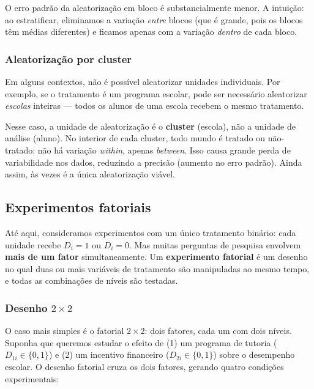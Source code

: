 \documentclass[
]{article}
\begin{document}
O erro padrão da aleatorização em bloco é substancialmente menor. A intuição: ao estratificar, eliminamos a variação \emph{entre} blocos (que é grande, pois os blocos têm médias diferentes) e ficamos apenas com a variação \emph{dentro} de cada bloco.

\subsubsection{Aleatorização por cluster}\label{aleatorizauxe7uxe3o-por-cluster}

Em alguns contextos, não é possível aleatorizar unidades individuais. Por exemplo, se o tratamento é um programa escolar, pode ser necessário aleatorizar \emph{escolas} inteiras --- todos os alunos de uma escola recebem o mesmo tratamento.

Nesse caso, a unidade de aleatorização é o \textbf{cluster} (escola), não a unidade de análise (aluno). No interior de cada cluster, todo mundo é tratado ou não-tratado: não há variação \emph{within}, apenas \emph{between}. Isso causa grande perda de variabilidade nos dados, reduzindo a precisão (aumento no erro padrão). Ainda assim, às vezes é a única aleatorização viável.

\subsection{Experimentos fatoriais}\label{experimentos-fatoriais}

Até aqui, consideramos experimentos com um único tratamento binário: cada unidade recebe \(D_i = 1\) ou \(D_i = 0\). Mas muitas perguntas de pesquisa envolvem \textbf{mais de um fator} simultaneamente. Um \textbf{experimento fatorial} é um desenho no qual duas ou mais variáveis de tratamento são manipuladas ao mesmo tempo, e todas as combinações de níveis são testadas.

\subsubsection{\texorpdfstring{Desenho \(2 \times 2\)}{Desenho 2 \textbackslash times 2}}\label{desenho-2-times-2}

O caso mais simples é o fatorial \(2 \times 2\): dois fatores, cada um com dois níveis. Suponha que queremos estudar o efeito de (1) um programa de tutoria (\(D_{1i} \in \{0,1\}\)) e (2) um incentivo financeiro (\(D_{2i} \in \{0,1\}\)) sobre o desempenho escolar. O desenho fatorial cruza os dois fatores, gerando quatro condições experimentais:
\end{document}

